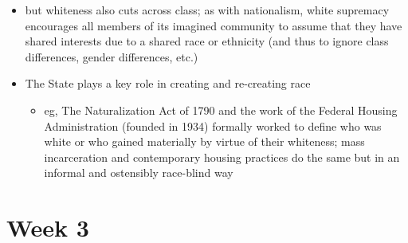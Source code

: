 \documentclass[12pt]{article}
\begin{document}
\begin{itemize}
\begin{itemize}
                    \item but whiteness also cuts across class; as with nationalism, white supremacy encourages all members of its imagined community to assume that they have shared interests due to a shared race or ethnicity (and thus to ignore class differences, gender differences, etc.)
                    \item The State plays a key role in creating and re-creating race
                    \begin{itemize}
                        \item eg, The Naturalization Act of 1790 and the work of the Federal Housing Administration (founded in 1934) formally worked to define who was white or who gained materially by virtue of their whiteness; mass incarceration and contemporary housing practices do the same but in an informal and ostensibly race-blind way
                    \end{itemize}
                \end{itemize}
            \end{itemize}
            \newpage
    \section{Week 3}
\end{document}

